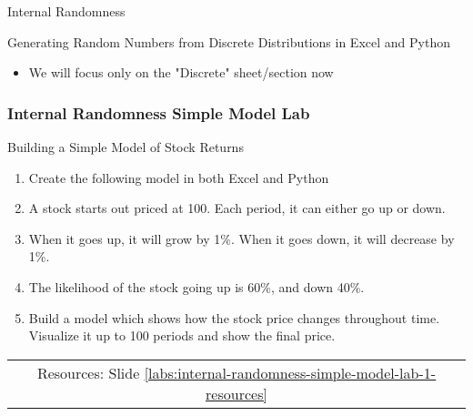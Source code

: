 \documentclass[handout, 11pt]{beamer}
\begin{document}
\begin{section}{Internal Randomness}
\begin{frame}
{\begin{block}{Generating Random Numbers from Discrete Distributions in Excel and Python}
\begin{itemize}
\item We will focus only on the "Discrete" sheet/section now
\end{itemize}
\end{block}
}
\end{frame}
\begin{frame}
\frametitle{Internal Randomness Simple Model Lab}
{
\begin{block}{Building a Simple Model of Stock Returns}
\begin{enumerate}
\item Create the following model in both Excel and Python
\item A stock starts out priced at 100. Each period, it can either go up or down.
\item When it goes up, it will grow by 1\%. When it goes down, it will decrease by 1\%.
\item The likelihood of the stock going up is 60\%, and down 40\%.
\item Build a model which shows how the stock price changes throughout time. Visualize it up to 100 periods and show the final price.
\end{enumerate}
\vfill
\begin{tabular*}{\textwidth}{@{\extracolsep{\fill}}ccc}
\toprule
\hfill & Resources: Slide \textcolor{blue}{\underline{\ref{labs:internal-randomness-simple-model-lab-1-resources}}} & \hfill\\


\end{tabular*}
\end{block}}
\end{frame}
\end{section}
\end{document}

